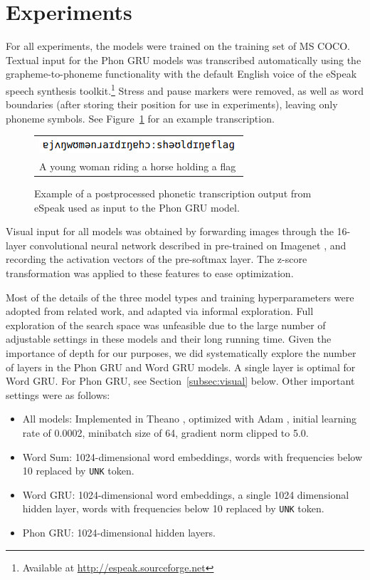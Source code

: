 \section{Experiments}
\label{sec:experiments}

For all experiments, the models were trained on the training set of MS COCO. Textual input for the {\sc Phon GRU} models was transcribed automatically using the grapheme-to-phoneme functionality with the default English voice of the eSpeak speech synthesis toolkit.\footnote{Available at \url{http://espeak.sourceforge.net}} Stress and pause markers were removed, as well as word boundaries (after storing their position for use in experiments), leaving only phoneme symbols. See Figure~\ref{fig:ipa} for an example transcription.

\begin{figure}
  \centering
  \begin{tabular}{|l|}\hline
    \includegraphics[scale=0.7]{woman-ipa.png} \\
    A young woman riding a horse holding a flag\\\hline
  \end{tabular}
  \caption{Example of a postprocessed phonetic transcription output
    from eSpeak used as input to the {\sc Phon GRU} model.}
  \label{fig:ipa}
\end{figure}

Visual input for all models was obtained by forwarding images through the 16-layer convolutional neural network described in  pre-trained on Imagenet \cite{ILSVRCarxiv14}, and recording the activation vectors of the pre-softmax layer. The z-score transformation was applied to these features to ease optimization. 

Most of the details of the three model types and training hyperparameters were adopted from related work, and adapted via informal exploration. Full exploration of the search space was unfeasible due to the large number of adjustable settings in these models and their long running time. Given the importance of depth for our purposes, we did systematically explore the number of layers in the {\sc Phon GRU} and {\sc Word GRU} models. A single layer is optimal for {\sc Word GRU}. For {\sc Phon GRU}, see Section~\ref{subsec:visual} below. Other important settings were as follows:
\begin{itemize}
\item All models: Implemented in Theano \cite{Bastien-Theano-2012}, optimized with 
  Adam \cite{DBLP:journals/corr/KingmaB14}, initial learning rate of 0.0002, minibatch size
  of 64, gradient norm clipped to 5.0.
\item {\sc Word Sum}: 1024-dimensional word embeddings, words with frequencies below 10 replaced by {\tt UNK} token.
\item {\sc Word GRU}: 1024-dimensional word embeddings, a single 1024 dimensional hidden layer, words with frequencies below 10 replaced by {\tt UNK} token.
\item {\sc Phon GRU}: 1024-dimensional hidden layers.
\end{itemize}

